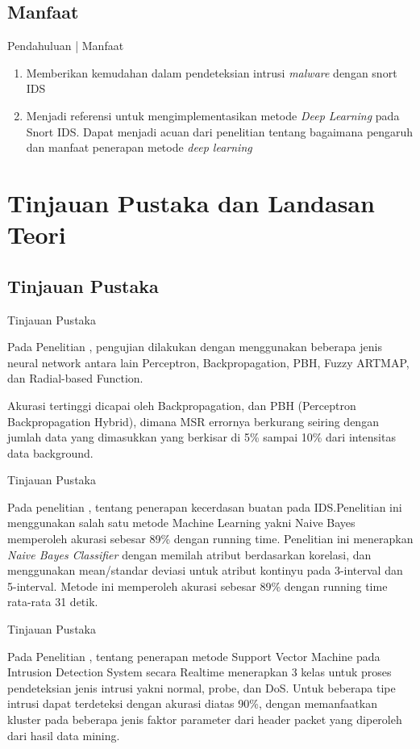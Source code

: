 \documentclass[t]{beamer}
\begin{document}
\subsection{Manfaat}
\begin{frame}{Pendahuluan | Manfaat}
	\begin{enumerate}
		\item Memberikan kemudahan dalam pendeteksian intrusi \textit{malware} dengan snort IDS
		\item Menjadi referensi untuk mengimplementasikan metode \textit{Deep Learning} pada Snort IDS. Dapat menjadi acuan dari penelitian tentang bagaimana pengaruh dan manfaat penerapan metode \textit{deep learning}
	\end{enumerate}
\end{frame}
\section{Tinjauan Pustaka dan Landasan Teori}
\subsection{Tinjauan Pustaka}
\begin{frame}{Tinjauan Pustaka}
	\par Pada Penelitian \cite{zhang2001hide}, pengujian dilakukan dengan menggunakan beberapa jenis neural network antara lain Perceptron, Backpropagation, PBH, Fuzzy ARTMAP, dan Radial-based Function.
	\par Akurasi tertinggi dicapai oleh Backpropagation, dan PBH (Perceptron Backpropagation Hybrid), dimana MSR errornya berkurang seiring dengan jumlah data yang dimasukkan yang berkisar di 5\% sampai 10\% dari intensitas data background.
\end{frame}
\begin{frame}{Tinjauan Pustaka}
	\par Pada penelitian \cite{wirawan2015penerapan}, tentang penerapan kecerdasan buatan pada IDS.Penelitian ini menggunakan salah satu metode Machine Learning yakni Naive Bayes memperoleh akurasi sebesar 89\% dengan running time. Penelitian ini menerapkan \textit{Naive Bayes Classifier} dengan memilah atribut berdasarkan korelasi, dan menggunakan mean/standar deviasi untuk atribut kontinyu pada 3-interval dan 5-interval. Metode ini memperoleh akurasi sebesar 89\% dengan running time rata-rata 31 detik.
\end{frame}
\begin{frame}{Tinjauan Pustaka}
	\par Pada Penelitian \cite{jacobus2014penerapan}, tentang penerapan metode Support Vector Machine pada Intrusion Detection System secara Realtime menerapkan 3 kelas untuk proses pendeteksian jenis intrusi yakni normal, probe, dan DoS. Untuk beberapa tipe intrusi dapat terdeteksi dengan akurasi diatas 90\%, dengan memanfaatkan kluster pada beberapa jenis faktor parameter dari header packet yang diperoleh dari hasil data mining.
\end{frame}
\end{document}
